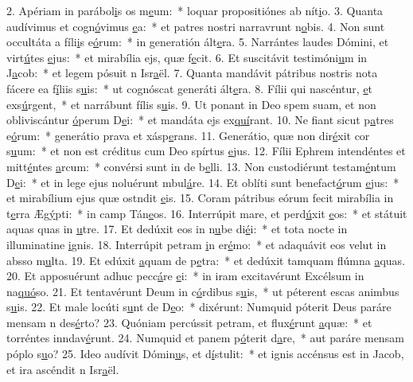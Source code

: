 2. Apériam in parábol\uline{i}s os m\uline{e}um:~* loquar propositiónes ab nít\uline{i}o.
3. Quanta audívimus et cogn\uline{ó}vimus \uline{e}a:~* et patres nostri narravrunt n\uline{o}bis.
4. Non sunt occultáta a fíli\uline{i}s e\uline{ó}rum:~* in generatión ált\uline{e}ra.
5. Narrántes laudes Dómini, et virt\uline{ú}tes \uline{e}jus:~* et mirabília ejs, quæ f\uline{e}cit.
6. Et suscitávit testimóni\uline{u}m in J\uline{a}cob:~* et legem pósuit n Isr\uline{a}ël.
7. Quanta mandávit pátribus nostris nota fácere ea f\uline{í}liis s\uline{u}is:~* ut cognóscat generáti ált\uline{e}ra.
8. Fílii qui nascéntur, \uline{e}t exs\uline{ú}rgent,~* et narrábunt fílis s\uline{u}is.
9. Ut ponant in Deo spem suam, et non obliviscántur \uline{ó}perum D\uline{e}i:~* et mandáta ejs ex\uline{quí}rant.
10. Ne fiant sicut p\uline{a}tres e\uline{ó}rum:~* generátio prava et xásp\uline{e}rans.
11. Generátio, quæ non dir\uline{é}xit cor s\uline{u}um:~* et non est créditus cum Deo spírtus \uline{e}jus.
12. Fílii Ephrem intendéntes et mitt\uline{é}ntes \uline{a}rcum:~* convérsi sunt in de b\uline{e}lli.
13. Non custodiérunt testam\uline{é}ntum D\uline{e}i:~* et in lege ejus noluérunt mbul\uline{á}re.
14. Et oblíti sunt benefact\uline{ó}rum \uline{e}jus:~* et mirabílium ejus quæ ostndit \uline{e}is.
15. Coram pátribus eórum fecit mirabília in t\uline{e}rra Æg\uline{ý}pti:~* in camp Tán\uline{e}os.
16. Interrúpit mare, et perd\uline{ú}xit \uline{e}os:~* et státuit aquas quas in \uline{u}tre.
17. Et dedúxit eos in n\uline{u}be di\uline{é}i:~* et tota nocte in illuminatine \uline{i}gnis.
18. Interrúpit petram \uline{i}n er\uline{é}mo:~* et adaquávit eos velut in absso m\uline{u}lta.
19. Et edúxit \uline{a}quam de p\uline{e}tra:~* et dedúxit tamquam flúmna \uline{a}quas.
20. Et apposuérunt adhuc pecc\uline{á}re \uline{e}i:~* in iram excitavérunt Excélsum in na\uline{quó}so.
21. Et tentavérunt Deum in c\uline{ó}rdibus s\uline{u}is,~* ut péterent escas animbus s\uline{u}is.
22. Et male locúti s\uline{u}nt de D\uline{e}o:~* dixérunt: Numquid póterit Deus paráre mensam n des\uline{é}rto?
23. Quóniam percússit petram, et flux\uline{é}runt \uline{a}quæ:~* et torréntes inndav\uline{é}runt.
24. Numquid et panem p\uline{ó}terit d\uline{a}re,~* aut paráre mensam póplo s\uline{u}o?
25. Ideo audívit Dómin\uline{u}s, et d\uline{í}stulit:~* et ignis accénsus est in Jacob, et ira ascéndit n Isr\uline{a}ël.
